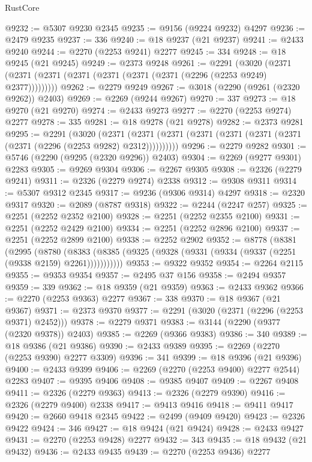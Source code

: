 \begin{lexlean}{RustCore}
\begin{coremodule}
@9232 := @5307 @9230 @2345
@9235 := @9156 (@9224 @9232) @4297
@9236 := @2479 @9235
@9237 := 336
@9240 := @18 @9237 (@21 @9237)
@9241 := @2433 @9240
@9244 := @2270 (@2253 @9241) @2277
@9245 := 334
@9248 := @18 @9245 (@21 @9245)
@9249 := @2373 @9248
@9261 := @2291
    (@3020 (@2371 (@2371 (@2371 (@2371 (@2371 (@2371 (@2371 (@2296 (@2253 @9249) @2377)))))))))
@9262 := @2279 @9249
@9267 := @3018 (@2290 (@9261 (@2320 @9262)) @2403)
@9269 := @2269 (@9244 @9267)
@9270 := 337
@9273 := @18 @9270 (@21 @9270)
@9274 := @2433 @9273
@9277 := @2270 (@2253 @9274) @2277
@9278 := 335
@9281 := @18 @9278 (@21 @9278)
@9282 := @2373 @9281
@9295 := @2291
    (@3020
      (@2371 (@2371 (@2371 (@2371 (@2371 (@2371 (@2371 (@2371 (@2296 (@2253 @9282) @2312))))))))))
@9296 := @2279 @9282
@9301 := @5746 (@2290 (@9295 (@2320 @9296)) @2403)
@9304 := @2269 (@9277 @9301) @2283
@9305 := @9269 @9304
@9306 := @2267 @9305
@9308 := @2326 (@2279 @9241)
@9311 := @2326 (@2279 @9274) @2338
@9312 := @9308 @9311
@9314 := @5307 @9312 @2345
@9317 := @9236 (@9306 @9314) @4297
@9318 := @2320 @9317
@9320 := @2089 (@8787 @9318)
@9322 := @2244 (@2247 @257)
@9325 := @2251 (@2252 @2352 @2100)
@9328 := @2251 (@2252 @2355 @2100)
@9331 := @2251 (@2252 @2429 @2100)
@9334 := @2251 (@2252 @2896 @2100)
@9337 := @2251 (@2252 @2899 @2100)
@9338 := @2252 @2902
@9352 := @8778
    (@8381
      (@2995
        (@8780
          (@8383 (@8385 (@9325 (@9328 (@9331 (@9334 (@9337 (@2251 (@9338 @2159) @2261)))))))))))
@9353 := @9322 @9352
@9354 := @2264 @2115
@9355 := @9353 @9354
@9357 := @2495 @37 @156
@9358 := @2494 @9357
@9359 := 339
@9362 := @18 @9359 (@21 @9359)
@9363 := @2433 @9362
@9366 := @2270 (@2253 @9363) @2277
@9367 := 338
@9370 := @18 @9367 (@21 @9367)
@9371 := @2373 @9370
@9377 := @2291 (@3020 (@2371 (@2296 (@2253 @9371) @2452)))
@9378 := @2279 @9371
@9383 := @3144 (@2290 (@9377 (@2320 @9378)) @2403)
@9385 := @2269 (@9366 @9383)
@9386 := 340
@9389 := @18 @9386 (@21 @9386)
@9390 := @2433 @9389
@9395 := @2269 (@2270 (@2253 @9390) @2277 @3309)
@9396 := 341
@9399 := @18 @9396 (@21 @9396)
@9400 := @2433 @9399
@9406 := @2269 (@2270 (@2253 @9400) @2277 @2544) @2283
@9407 := @9395 @9406
@9408 := @9385 @9407
@9409 := @2267 @9408
@9411 := @2326 (@2279 @9363)
@9413 := @2326 (@2279 @9390)
@9416 := @2326 (@2279 @9400) @2338
@9417 := @9413 @9416
@9418 := @9411 @9417
@9420 := @2660 @9418 @2345
@9422 := @2499 (@9409 @9420)
@9423 := @2326 @9422
@9424 := 346
@9427 := @18 @9424 (@21 @9424)
@9428 := @2433 @9427
@9431 := @2270 (@2253 @9428) @2277
@9432 := 343
@9435 := @18 @9432 (@21 @9432)
@9436 := @2433 @9435
@9439 := @2270 (@2253 @9436) @2277

\end{coremodule}
\end{lexlean}
